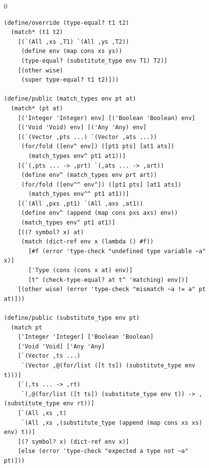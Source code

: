 \documentclass[7x10]{TimesAPriori_MIT}%
\def\racketEd{0}
\def\edition{0}
\numberwithin{theorem}{chapter}
\numberwithin{definition}{chapter}
\numberwithin{equation}{chapter}
\begin{document}
\begin{figure}[tbp]
\begin{tcolorbox}[colback=white]  
\if\edition\racketEd    
\begin{lstlisting}[basicstyle=\ttfamily\scriptsize]
(define/override (type-equal? t1 t2)
  (match* (t1 t2)
    [(`(All ,xs ,T1) `(All ,ys ,T2))
     (define env (map cons xs ys))
     (type-equal? (substitute_type env T1) T2)]
    [(other wise)
     (super type-equal? t1 t2)]))

(define/public (match_types env pt at)
  (match* (pt at)
    [('Integer 'Integer) env] [('Boolean 'Boolean) env]
    [('Void 'Void) env] [('Any 'Any) env]
    [(`(Vector ,pts ...) `(Vector ,ats ...))
     (for/fold ([env^ env]) ([pt1 pts] [at1 ats])
       (match_types env^ pt1 at1))]
    [(`(,pts ... -> ,prt) `(,ats ... -> ,art))
     (define env^ (match_types env prt art))
     (for/fold ([env^^ env^]) ([pt1 pts] [at1 ats])
       (match_types env^^ pt1 at1))]
    [(`(All ,pxs ,pt1) `(All ,axs ,at1))
     (define env^ (append (map cons pxs axs) env))
     (match_types env^ pt1 at1)]
    [((? symbol? x) at)
     (match (dict-ref env x (lambda () #f))
       [#f (error 'type-check "undefined type variable ~a" x)]
       ['Type (cons (cons x at) env)]
       [t^ (check-type-equal? at t^ 'matching) env])]
    [(other wise) (error 'type-check "mismatch ~a != a" pt at)]))

(define/public (substitute_type env pt)
  (match pt
    ['Integer 'Integer] ['Boolean 'Boolean]
    ['Void 'Void] ['Any 'Any]
    [`(Vector ,ts ...)
     `(Vector ,@(for/list ([t ts]) (substitute_type env t)))]
    [`(,ts ... -> ,rt)
     `(,@(for/list ([t ts]) (substitute_type env t)) -> ,(substitute_type env rt))]
    [`(All ,xs ,t)
     `(All ,xs ,(substitute_type (append (map cons xs xs) env) t))]
    [(? symbol? x) (dict-ref env x)]
    [else (error 'type-check "expected a type not ~a" pt)]))


\end{lstlisting}
\end{tcolorbox}
\end{figure}
\end{document}
